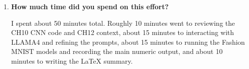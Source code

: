 \documentclass[10pt]{extarticle}
\begin{document}
\begin{enumerate}[label=\arabic*., leftmargin=2em]
\item \textbf{How much time did you spend on this effort?}

I spent about 50 minutes total. Roughly 10 minutes went to reviewing the CH10 CNN code and CH12 context, about 15 minutes to interacting with LLAMA4 and refining the prompts, about 15 minutes to running the Fashion MNIST models and recording the main numeric output, and about 10 minutes to writing the LaTeX summary.

\end{enumerate}
\end{document}
